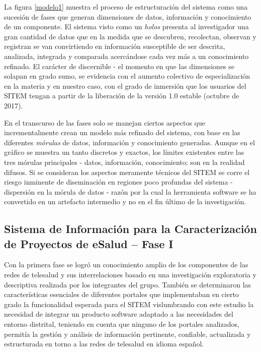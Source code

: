 La figura \ref{modelo1} muestra el proceso de estructuración del sistema como una sucesión de fases que generan dimensiones de datos, información y conocimiento de un componente. El sistema visto como un \textit{holos} presenta al investigador una gran cantidad de datos que en la medida que se descubren, recolectan, observan y registran se van convirtiendo en información susceptible de ser descrita, analizada, integrada y comparada acercándose cada vez más a un conocimiento refinado. El carácter de discernible - el momento en que las dimensiones se solapan en grado sumo, se evidencia con el aumento colectivo de especialización en la materia y en nuestro caso, con el grado de inmersión que los usuarios del SITEM tengan a partir de la liberación de la versión 1.0 estable (octubre de 2017).

En el transcurso de las fases solo se manejan ciertos aspectos que incrementalmente crean un modelo más refinado del sistema, con base en las diferentes \textit{mórulas} de datos, información y conocimiento generadas. Aunque en el gráfico se muestra un tanto discretos y exactos, los límites existentes entre las tres mórulas principales - datos, información, conocimiento; son en la realidad difusos. Si se consideran los aspectos meramente técnicos del SITEM se corre el riesgo inminente de diseminación en regiones poco profundas del sistema - dispersión en la mórula de datos - razón por la cual la herramienta software se ha convertido en un artefacto intermedio y no en el fin último de la investigación.

\subsection{Sistema de Información para la Caracterización de Proyectos de eSalud – Fase I}
Con la primera fase  se logró un conocimiento amplio de los componentes de las redes de telesalud y sus interrelaciones basado en una investigación exploratoria y descriptiva realizada por los integrantes del grupo. También se determinaron las características esenciales de diferentes portales que implementaban en cierto grado la funcionalidad esperada para el SITEM vislumbrando con este estudio la necesidad de integrar un producto software adaptado a las necesidades del entorno distrital, teniendo en cuenta que ninguno de los portales analizados, permitía la gestión y análisis de información pertinente, confiable, actualizada y estructurada en torno a las redes de telesalud en idioma español.

